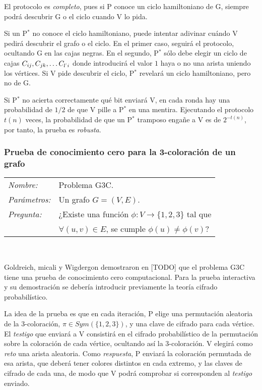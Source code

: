 \hfil


El protocolo es \textit{completo}, pues si P conoce un ciclo hamiltoniano de G, siempre podrá descubrir G o el ciclo cuando V lo pida.

Si un P$^*$ no conoce el ciclo hamiltoniano, puede intentar adivinar cuándo V pedirá descubrir el grafo o el ciclo. En el primer caso, seguirá el protocolo, ocultando G en las cajas negras. En el segundo, P$^*$ sólo debe elegir un ciclo de cajas  $C_{ij}, C_{jk}, \dots C_{l^`i}$ donde introducirá el valor $1$ haya o no una arista uniendo los vértices. Si V pide descubrir el ciclo, P$^*$ revelará un ciclo hamiltoniano, pero no de G.

Si P$^*$ no acierta correctamente qué bit enviará V, en cada ronda hay una probabilidad de $1/2$ de que V pille a P$^*$ en una mentira. Ejecutando el protocolo $t(n)$ veces, la probabilidad de que un P$^*$ tramposo engañe a V es de $2^{-t(n)}$, por tanto, la prueba es \textit{robusta}.



\subsubsection{Prueba de conocimiento cero para la 3-coloración de un grafo}


\hfil

\begin{tabular}{|ll}
	\textit{Nombre:} & Problema G3C. \\
	\textit{Parámetros:} &Un grafo $G=(V,E)$. \\
	\textit{Pregunta:} & ¿Existe una función $\phi : V \to \{1,2,3\}$ tal que \\ & $\forall (u,v)\in E$, se cumple $\phi(u)\neq \phi(v)$? \\
\end{tabular}
\\

\hfil

Goldreich, micali y Wigdergon demostraron en [TODO] que el problema G3C tiene una prueba de conocimiento cero computacional. Para la prueba interactiva y su demostración se debería introducir previamente la teoría cifrado probabilístico.

La idea de la prueba es que en cada iteración, P elige una permutación aleatoria de la 3-coloración, $\pi \in Sym(\{1,2,3\})$, y una clave de cifrado para cada vértice. El \textit{testigo} que enviará a V consistirá en el cifrado probabilístico de la permutación sobre la coloración de cada vértice, ocultando así la 3-coloración. V elegirá como \textit{reto} una arista aleatoria. Como \textit{respuesta}, P enviará la coloración permutada de esa arista, que deberá tener colores distintos en cada extremo, y las claves de cifrado de cada una, de modo que V podrá comprobar si corresponden al \textit{testigo} enviado.

